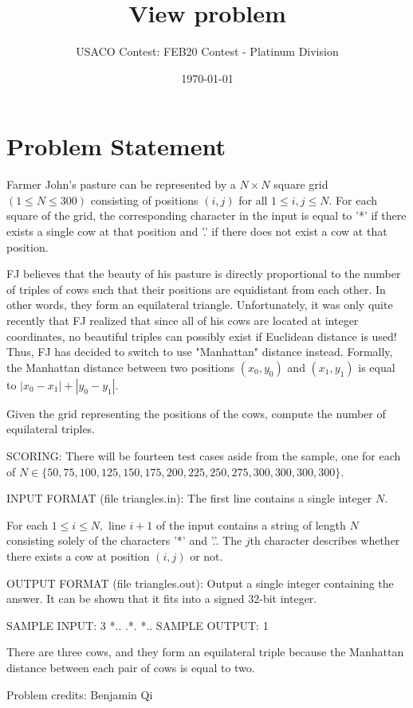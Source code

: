 \documentclass[12pt]{article}
\title{View problem}
\author{USACO Contest: FEB20 Contest - Platinum Division}
\date{\today}
\begin{document}
\maketitle

\section*{Problem Statement}

Farmer John's pasture can be represented by a $N\times N$  square grid
$(1\le N\le 300)$ consisting of positions $(i,j)$ for all $1\le i,j\le N$. For
each square of the grid, the corresponding character in the input is equal to
'*' if there exists a single cow at that position and '.' if there does not
exist a cow at that position.

FJ believes that the beauty of his pasture is directly proportional to the
number of triples of cows such that their positions are equidistant from each
other. In other words, they form an equilateral triangle. Unfortunately, it was
only quite recently that FJ realized that since all of his cows are located at
integer coordinates, no beautiful triples can possibly exist if Euclidean
distance is used! Thus, FJ has decided to switch to use "Manhattan" distance
instead. Formally, the Manhattan distance between two positions $(x_0,y_0)$ and
$(x_1,y_1)$ is equal to $|x_0-x_1|+|y_0-y_1|$.

Given the grid representing the positions of the cows, compute the number of
equilateral triples.

SCORING:
There will be fourteen test cases aside from the sample, one for each of
$N\in \{50,75,100,125,150,175,200,225,250,275,300,300,300,300\}.$

INPUT FORMAT (file triangles.in):
The first line contains a single integer $N.$

For each $1\le i\le N,$ line $i+1$ of the input contains a string of length $N$
consisting solely of the characters '*' and '.'. The $j$th character 
describes whether there exists a cow at position $(i,j)$ or not.

OUTPUT FORMAT (file triangles.out):
Output a single integer containing the answer. It can be shown that it fits into
a signed 32-bit integer.

SAMPLE INPUT:
3
*..
.*.
*..
SAMPLE OUTPUT: 
1

There are three cows, and they form an equilateral triple because the Manhattan
distance between each pair of cows is equal to two.


Problem credits: Benjamin Qi
\end{document}
